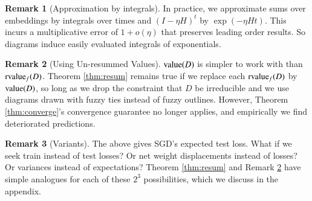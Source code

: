 \documentclass{article}
\theoremstyle{plain}
\theoremstyle{definition}
\newtheorem{rmk}{Remark}
\newcommand{\dvalue}{\text{\textnormal{value}}}
\newcommand{\rvalue}{\text{\textnormal{rvalue}}}
\begin{document}
 
        \begin{rmk}[Approximation by integrals]
            In practice, we approximate sums over embeddings by integrals over
            times and $(I-\eta H)^t$ by $\exp(- \eta H t)$.  This incurs a
            multiplicative error of $1 + o(\eta)$ that preserves
            leading order results.  So diagrams induce easily evaluated
            integrals of exponentials.
        \end{rmk}

        \begin{rmk}[Using Un-resummed Values] \label{rmk:unresum}
            $\dvalue(D)$ is simpler to work with than $\rvalue_f(D)$.  Theorem
            \ref{thm:resum} remains true if we replace each $\rvalue_f(D)$ by
            $\dvalue(D)$, so long as we drop the constraint that $D$ be
            irreducible and we use diagrams drawn with fuzzy ties instead of
            fuzzy outlines.  However, Theorem \ref{thm:converge}'s convergence
            guarantee no longer applies, and empirically we find deteriorated
            predictions.
        \end{rmk}

        
        \begin{rmk}[Variants]
            The above gives SGD's expected test loss.  What if we seek train
            instead of test losses?  Or net weight displacements instead of losses?
            Or variances instead of expectations?  
            Theorem \ref{thm:resum} and Remark \ref{rmk:unresum} have simple
            analogues for each of these $2^3$ possibilities, which we discuss
            in the appendix. 
        \end{rmk}
\end{document}
